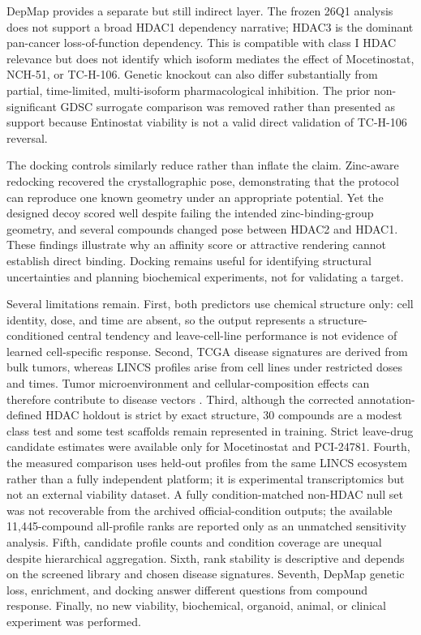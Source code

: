 DepMap provides a separate but still indirect layer. The frozen 26Q1 analysis does not support a broad HDAC1 dependency narrative; HDAC3 is the dominant pan-cancer loss-of-function dependency. This is compatible with class I HDAC relevance but does not identify which isoform mediates the effect of Mocetinostat, NCH-51, or TC-H-106. Genetic knockout can also differ substantially from partial, time-limited, multi-isoform pharmacological inhibition. The prior non-significant GDSC surrogate comparison was removed rather than presented as support because Entinostat viability is not a valid direct validation of TC-H-106 reversal.

The docking controls similarly reduce rather than inflate the claim. Zinc-aware redocking recovered the crystallographic pose, demonstrating that the protocol can reproduce one known geometry under an appropriate potential. Yet the designed decoy scored well despite failing the intended zinc-binding-group geometry, and several compounds changed pose between HDAC2 and HDAC1. These findings illustrate why an affinity score or attractive rendering cannot establish direct binding. Docking remains useful for identifying structural uncertainties and planning biochemical experiments, not for validating a target.

Several limitations remain. First, both predictors use chemical structure only: cell identity, dose, and time are absent, so the output represents a structure-conditioned central tendency and leave-cell-line performance is not evidence of learned cell-specific response. Second, TCGA disease signatures are derived from bulk tumors, whereas LINCS profiles arise from cell lines under restricted doses and times. Tumor microenvironment and cellular-composition effects can therefore contribute to disease vectors \cite{chouaib2014}. Third, although the corrected annotation-defined HDAC holdout is strict by exact structure, 30 compounds are a modest class test and some test scaffolds remain represented in training. Strict leave-drug candidate estimates were available only for Mocetinostat and PCI-24781. Fourth, the measured comparison uses held-out profiles from the same LINCS ecosystem rather than a fully independent platform; it is experimental transcriptomics but not an external viability dataset. A fully condition-matched non-HDAC null set was not recoverable from the archived official-condition outputs; the available 11,445-compound all-profile ranks are reported only as an unmatched sensitivity analysis. Fifth, candidate profile counts and condition coverage are unequal despite hierarchical aggregation. Sixth, rank stability is descriptive and depends on the screened library and chosen disease signatures. Seventh, DepMap genetic loss, enrichment, and docking answer different questions from compound response. Finally, no new viability, biochemical, organoid, animal, or clinical experiment was performed.

